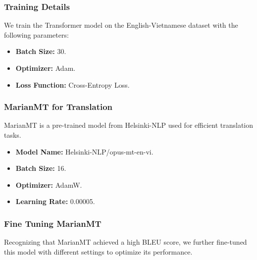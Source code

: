 \documentclass{article}
\begin{document}
\subsubsection{Training Details}
We train the Transformer model on the English-Vietnamese dataset with the following parameters:

\begin{itemize}
\item \textbf{Batch Size:} 30.
\item \textbf{Optimizer:} Adam.
\item \textbf{Loss Function:} Cross-Entropy Loss.
\end{itemize}

\subsubsection{MarianMT for Translation}
MarianMT is a pre-trained model from Helsinki-NLP used for efficient translation tasks.

\begin{itemize}
\item \textbf{Model Name:} Helsinki-NLP/opus-mt-en-vi.
\item \textbf{Batch Size:} 16.
\item \textbf{Optimizer:} AdamW.
\item \textbf{Learning Rate:} 0.00005.
\end{itemize}

\subsubsection{Fine Tuning MarianMT}
Recognizing that MarianMT achieved a high BLEU score, we further fine-tuned this model with different settings to optimize its performance.
\end{document}
